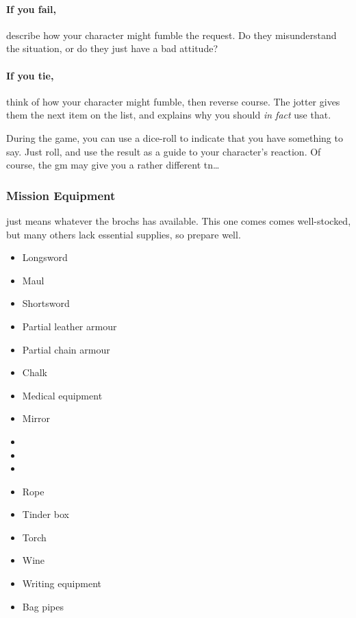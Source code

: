 \begin{multicols}{2}
\paragraph{If you fail,}
describe how your character might fumble the request.
Do they misunderstand the situation, or do they just have a bad attitude?

\paragraph{If you tie,}
think of how your character might fumble, then reverse course.
The jotter gives them the next item on the list, and explains why you should \emph{in fact} use that.

During the game, you can use a dice-roll to indicate that you have something to say.
Just roll, and use the result as a guide to your character's reaction.%
Of course, the \gls{gm} may give you a rather different \gls{tn}\ldots

\subsubsection{Mission Equipment}
\label{start_equipment}
just means whatever the \glspl{broch} has available.
This one comes comes well-stocked, but many others lack essential supplies, so prepare well.

\begin{multicols}{2}
\begin{itemize}
\raggedright
  \item
  Longsword
  \item
  Maul
  \item
  Shortsword
  \item
  Partial leather armour
  \item
  Partial chain armour
  \item
  Chalk
  \item
  Medical equipment
  \item
  Mirror
  \item
  \rations
  \item
  \rations
  \item
  \rations
  \item
  Rope
  \item
  Tinder box
  \item
  Torch
  \item
  Wine
  \item
  Writing equipment
  \item
  Bag pipes
\end{itemize}


\end{multicols}
\end{multicols}
